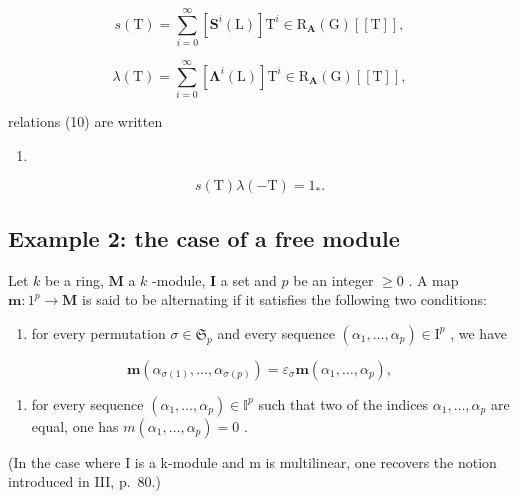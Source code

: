\[
s (\mathrm{T}) = \sum_ {i = 0} ^ {\infty} \left[ \mathbf {S} ^ {i} (\mathrm{L}) \right] \mathrm{T} ^ {i} \in \mathrm{R} _ {\mathbf {A}} (\mathrm{G}) [ [ \mathrm{T} ] ],
\]

\[
\lambda (\mathrm{T}) = \sum_ {i = 0} ^ {\infty} \left[ \boldsymbol {\Lambda} ^ {i} (\mathrm{L}) \right] \mathrm{T} ^ {i} \in \mathrm{R} _ {\mathbf {A}} (\mathrm{G}) [ [ \mathrm{T} ] ],
\]

relations (10) are written

\begin{enumerate}
\def\labelenumi{(\arabic{enumi})}
\setcounter{enumi}{10}
\tightlist
\item
\end{enumerate}

\[
s (\mathrm{T}) \lambda (- \mathrm{T}) = 1 _ {*}.
\]

\subsection{Example 2: the case of a free module}

Let \(k\) be a ring, \(\mathbf{M}\) a \(k\) -module, \(\mathbf{I}\) a set and \(p\) be an integer \(\geqslant 0\) . A map \(\boldsymbol{m}:1^{p}\to\mathbf{M}\) is said to be alternating if it satisfies the following two conditions:

\begin{enumerate}
\def\labelenumi{\alph{enumi})}
\tightlist
\item
  for every permutation \(\sigma \in \mathfrak{S}_p\) and every sequence \((\alpha_1, \ldots, \alpha_p) \in \mathrm{I}^p\) , we have
\end{enumerate}

\[
\boldsymbol {m} \left(\alpha_ {\sigma (1)}, \dots , \alpha_ {\sigma (p)}\right) = \varepsilon_ {\sigma} \boldsymbol {m} \left(\alpha_ {1}, \dots , \alpha_ {p}\right),
\]

\begin{enumerate}
\def\labelenumi{\alph{enumi})}
\setcounter{enumi}{1}
\tightlist
\item
  for every sequence \((\alpha_{1},\ldots,\alpha_{p})\in\mathbb{I}^{p}\) such that two of the indices \(\alpha_{1},\ldots,\alpha_{p}\) are equal, one has \(m(\alpha_{1},\ldots,\alpha_{p})=0\) .
\end{enumerate}

(In the case where I is a k-module and m is multilinear, one recovers the notion introduced in III, p.~80.)

